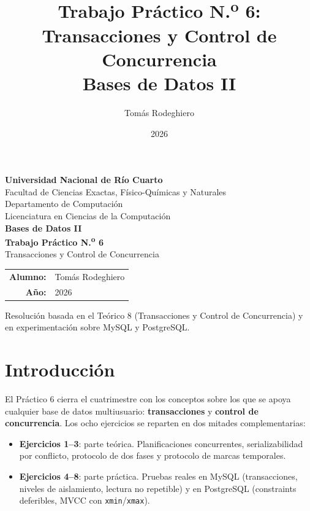 \documentclass[11pt,a4paper]{article}
\title{Trabajo Práctico N.\textsuperscript{o} 6:
       Transacciones y Control de Concurrencia\\[4pt]
       \large Bases de Datos II}
\author{Tomás Rodeghiero}
\date{2026}
\begin{document}
\begin{titlepage}
    \centering
    \vspace*{1.5cm}

    {\large \textbf{Universidad Nacional de Río Cuarto}}\\[6pt]
    {\normalsize Facultad de Ciencias Exactas, Físico-Químicas y Naturales}\\[4pt]
    {\normalsize Departamento de Computación}\\[4pt]
    {\normalsize Licenciatura en Ciencias de la Computación}\\[3cm]

    {\Large \textbf{Bases de Datos II}}\\[1.2cm]

    {\Large \textbf{Trabajo Práctico N.\textsuperscript{o} 6}}\\[6pt]
    {\large Transacciones y Control de Concurrencia}\\[3cm]

    \begin{tabular}{rl}
        \textbf{Alumno:} & Tomás Rodeghiero \\[4pt]
        \textbf{Año:}    & 2026 \\
    \end{tabular}

    \vfill
    {\small Resolución basada en el Teórico 8 (Transacciones y Control de
    Concurrencia) y en experimentación sobre MySQL y PostgreSQL.}
\end{titlepage}

\tableofcontents
\newpage

\section{Introducción}

El Práctico 6 cierra el cuatrimestre con los conceptos sobre los que se apoya cualquier base de datos multiusuario: \textbf{transacciones} y \textbf{control de concurrencia}. Los ocho ejercicios se reparten en dos mitades complementarias:

\begin{itemize}
    \item \textbf{Ejercicios 1--3}: parte teórica. Planificaciones concurrentes, serializabilidad por conflicto, protocolo de dos fases y protocolo de marcas temporales.
    \item \textbf{Ejercicios 4--8}: parte práctica. Pruebas reales en MySQL (transacciones, niveles de aislamiento, lectura no repetible) y en PostgreSQL (constraints deferibles, MVCC con \texttt{xmin}/\texttt{xmax}).
\end{itemize}
\end{document}
